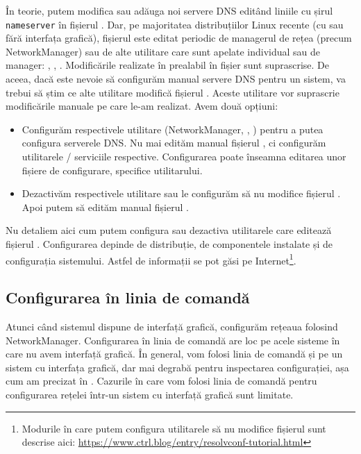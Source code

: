 În teorie, putem modifica sau adăuga noi servere DNS editând liniile cu șirul \texttt{nameserver} în fișierul .
Dar, pe majoritatea distribuțiilor Linux recente (cu sau fără interfața grafică), fișierul  este editat periodic de managerul de rețea (precum NetworkManager) sau de alte utilitare care sunt apelate individual sau de manager: , , .
Modificările realizate în prealabil în fișier sunt suprascrise.
De aceea, dacă este nevoie să configurăm manual servere DNS pentru un sistem, va trebui să știm ce alte utilitare modifică fișierul .
Aceste utilitare vor suprascrie modificările manuale pe care le-am realizat.
Avem două opțiuni:
\begin{itemize}
  \item Configurăm respectivele utilitare (NetworkManager, , ) pentru a putea configura serverele DNS.
    Nu mai edităm manual fișierul , ci configurăm utilitarele / serviciile respective.
    Configurarea poate înseamna editarea unor fișiere de configurare, specifice utilitarului.
  \item Dezactivăm respectivele utilitare sau le configurăm să nu modifice fișierul .
    Apoi putem să edităm manual fișierul .
\end{itemize}

Nu detaliem aici cum putem configura sau dezactiva utilitarele care editează fișierul .
Configurarea depinde de distribuție, de componentele instalate și de configurația sistemului.
Astfel de informații se pot găsi pe Internet\footnote{Modurile în care putem configura utilitarele să nu modifice fișierul  sunt descrise aici: \url{https://www.ctrl.blog/entry/resolvconf-tutorial.html}}.

\subsection{Configurarea în linia de comandă}
\label{sec:net:linux-config:cli}

Atunci când sistemul dispune de interfață grafică, configurăm rețeaua folosind NetworkManager.
Configurarea în linia de comandă are loc pe acele sisteme în care nu avem interfață grafică.
În general, vom folosi linia de comandă și pe un sistem cu interfața grafică, dar mai degrabă pentru inspectarea configurației, așa cum am precizat în .
Cazurile în care vom folosi linia de comandă pentru configurarea rețelei într-un sistem cu interfață grafică sunt limitate.

